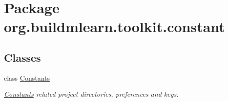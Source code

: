 \hypertarget{namespaceorg_1_1buildmlearn_1_1toolkit_1_1constant}{}\section{Package org.\+buildmlearn.\+toolkit.\+constant}
\label{namespaceorg_1_1buildmlearn_1_1toolkit_1_1constant}
\subsection*{Classes}
\begin{DoxyCompactItemize}
\item 
class \hyperlink{classorg_1_1buildmlearn_1_1toolkit_1_1constant_1_1Constants}{Constants}
\begin{DoxyCompactList}\small\item\em \hyperlink{classorg_1_1buildmlearn_1_1toolkit_1_1constant_1_1Constants}{Constants} related project directories, preferences and keys. \end{DoxyCompactList}\end{DoxyCompactItemize}
